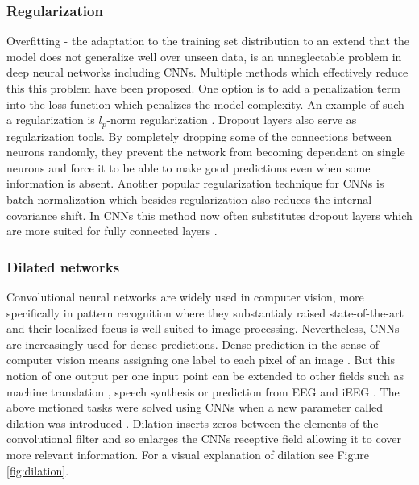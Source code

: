 \subsubsection{Regularization}
Overfitting - the adaptation to the training set distribution to an extend that the model does not generalize well over unseen data, is an unneglectable problem in deep neural networks including CNNs.
Multiple methods which effectively reduce this this problem have been proposed.
One option is to add a penalization term into the loss function which penalizes the model complexity.
An example of such a regularization is $l_p$-norm regularization \cite{cnn-description}.
Dropout layers \cite{drop-out} also serve as regularization tools. 
By completely dropping some of the connections between neurons randomly, they prevent the network from becoming dependant on single neurons and force it to be able to make good predictions even when some information is absent.
Another popular regularization technique for CNNs is batch normalization \cite{batch-norm} which besides regularization also reduces the internal covariance shift. 
In CNNs this method now often substitutes dropout layers which are more suited for fully connected layers \cite{cnn-description}.


\subsubsection{Dilated networks}
Convolutional neural networks are widely used in computer vision, more specifically in pattern recognition where they substantialy raised state-of-the-art \cite{alexnet, dnn-computer-vision} and their localized focus is well suited to image processing.
Nevertheless, CNNs are increasingly used for dense predictions.
Dense prediction in the sense of computer vision means assigning one label to each pixel of an image \cite{dense-prediction-images}. 
But this notion of one output per one input point can be extended to other fields such as machine translation \cite{dense-prediction-machine-translation}, speech synthesis \cite{wavenet} or prediction from EEG \cite{schirrmeister-deep-2017} and iEEG \cite{Hammer-2021}.
The above metioned tasks were solved using CNNs when a new parameter called dilation was introduced \cite{dense-prediction-images}.
Dilation inserts zeros between the elements of the convolutional filter and so enlarges the CNNs receptive field allowing it to cover more relevant information.
For a visual explanation of dilation see Figure \ref{fig:dilation}.

